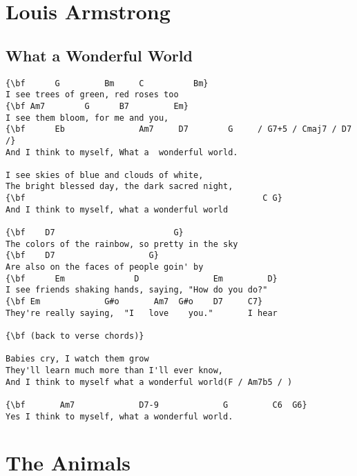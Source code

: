 \documentclass[a4paper]{article}
\begin{document}
\section{Louis Armstrong} %
\label{sec:Louis Armstrong}
\subsection{What a Wonderful World} %
\label{sub:What a Wonderful Worl}
\begin{Verbatim}[commandchars=\\\{\}]
{\bf      G         Bm     C          Bm}
I see trees of green, red roses too
{\bf Am7        G      B7         Em}
I see them bloom, for me and you,
{\bf      Eb               Am7     D7        G     / G7+5 / Cmaj7 / D7 /}
And I think to myself, What a  wonderful world.

I see skies of blue and clouds of white,
The bright blessed day, the dark sacred night,
{\bf                                                C G}
And I think to myself, what a wonderful world

{\bf    D7                        G}
The colors of the rainbow, so pretty in the sky
{\bf    D7                   G}
Are also on the faces of people goin' by
{\bf      Em              D               Em         D}
I see friends shaking hands, saying, "How do you do?"
{\bf Em             G#o       Am7  G#o    D7     C7}
They're really saying,  "I   love    you."       I hear

{\bf (back to verse chords)}

Babies cry, I watch them grow
They'll learn much more than I'll ever know,
And I think to myself what a wonderful world(F / Am7b5 / )

{\bf       Am7             D7-9             G         C6  G6}
Yes I think to myself, what a wonderful world.
\end{Verbatim}
\newpage
\section{The Animals} %
\label{sec:The Animals}
\end{document}
